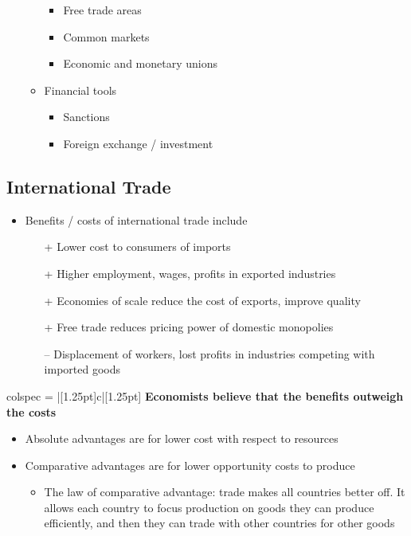 \documentclass[../notes_compiled.tex]{subfiles}
\begin{document}
\begin{itemize}
\begin{itemize}
\begin{itemize}
\item Free trade areas
\item Common markets
\item Economic and monetary unions
\end{itemize}
\item Financial tools
\begin{itemize}
\item Sanctions
\item Foreign exchange / investment
\end{itemize}
\end{itemize}
\end{itemize}


\subsection{International Trade}
\begin{itemize}
\item Benefits / costs of international trade include
\begin{itemize}
\item[+] Lower cost to consumers of imports
\item[+] Higher employment, wages, profits in exported industries
\item[+] Economies of scale reduce the cost of exports, improve quality
\item[+] Free trade reduces pricing power of domestic monopolies
\item[] 
\item[--] Displacement of workers, lost profits in industries competing with imported goods
\end{itemize}
\end{itemize}
\begin{table}[h!]
\centering
\begin{tblr}{colspec = {|[1.25pt]c|[1.25pt]}}
\hline[1.25pt]
\textbf{Economists believe that the benefits outweigh the costs} \\ \hline[1.25pt]
\end{tblr}
\end{table}
\begin{itemize}
\item Absolute advantages are for lower cost with respect to resources
\item Comparative advantages are for lower opportunity costs to produce
\begin{itemize}
\item The law of comparative advantage: trade makes all countries better off. It allows each country to focus production on goods they can produce efficiently, and then they can trade with other countries for other goods
\end{itemize}
\end{itemize}
\end{document}
